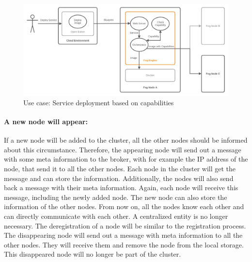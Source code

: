\begin{figure}[H]
    \centering
    \includegraphics[width=\textwidth]{resources/images/use_case_deploy_service_multiple_nodes.png}
    \caption[Use case: Service deployment based on capabilities]{Use case: Service deployment based on capabilities}
    \label{fig:use_case_deploy_service_multiple_nodes}
\end{figure}

\paragraph{A new node will appear:}
If a new node will be added to the cluster, all the other nodes should be informed about this circumstance.
Therefore, the appearing node will send out a message with some meta information to the broker, with for example the \ac{IP} address of the node, that send it to all the other nodes.
Each node in the cluster will get the message and can store the information.
Additionally, the nodes will also send back a message with their meta information.
Again, each node will receive this message, including the newly added node.
The new node can also store the information of the other nodes.
From now on, all the nodes know each other and can directly communicate with each other.
A centralized entity is no longer necessary.
The deregistration of a node will be similar to the registration process.
The disappearing node will send out a message with meta information to all the other nodes.
They will receive them and remove the node from the local storage.
This disappeared node will no longer be part of the cluster.

